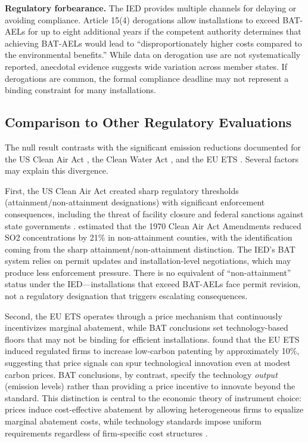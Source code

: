 \documentclass[12pt]{article}
\begin{document}
\textbf{Regulatory forbearance.} The IED provides multiple channels for delaying or avoiding compliance. Article 15(4) derogations allow installations to exceed BAT-AELs for up to eight additional years if the competent authority determines that achieving BAT-AELs would lead to ``disproportionately higher costs compared to the environmental benefits.'' While data on derogation use are not systematically reported, anecdotal evidence suggests wide variation across member states. If derogations are common, the formal compliance deadline may not represent a binding constraint for many installations.

\subsection{Comparison to Other Regulatory Evaluations}

The null result contrasts with the significant emission reductions documented for the US Clean Air Act \citep{greenstone2004, shapiro2024}, the Clean Water Act \citep{keiser2019, colmer2024}, and the EU ETS \citep{calel2020ets, delogu2022}. Several factors may explain this divergence.

First, the US Clean Air Act created sharp regulatory thresholds (attainment/non-attainment designations) with significant enforcement consequences, including the threat of facility closure and federal sanctions against state governments \citep{greenstone2004, walker2013}. \citet{greenstone2004} estimated that the 1970 Clean Air Act Amendments reduced SO2 concentrations by 21\% in non-attainment counties, with the identification coming from the sharp attainment/non-attainment distinction. The IED's BAT system relies on permit updates and installation-level negotiations, which may produce less enforcement pressure. There is no equivalent of ``non-attainment'' status under the IED---installations that exceed BAT-AELs face permit revision, not a regulatory designation that triggers escalating consequences.

Second, the EU ETS operates through a price mechanism that continuously incentivizes marginal abatement, while BAT conclusions set technology-based floors that may not be binding for efficient installations. \citet{calel2020ets} found that the EU ETS induced regulated firms to increase low-carbon patenting by approximately 10\%, suggesting that price signals can spur technological innovation even at modest carbon prices. BAT conclusions, by contrast, specify the technology \emph{output} (emission levels) rather than providing a price incentive to innovate beyond the standard. This distinction is central to the economic theory of instrument choice: prices induce cost-effective abatement by allowing heterogeneous firms to equalize marginal abatement costs, while technology standards impose uniform requirements regardless of firm-specific cost structures \citep{hepburn2006}.
\end{document}
